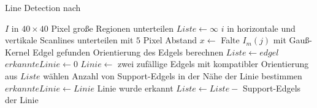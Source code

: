 \begin{algorithm}
	\caption{Line Detection nach \citeauthor{clarke96}}
	\label{src:lineDetection}
	\begin{algorithmic}[1]
		\State $I$ in $40 \times 40$ Pixel große Regionen unterteilen
			\State $Liste \gets \infty$
			\State $i$ in horizontale und vertikale Scanlines unterteilen mit $5$ Pixel Abstand
				\State $x \gets$ Falte $I_m\left(j\right)$ mit Gauß-Kernel
					\Comment Edgel gefunden
					\State Orientierung des Edgels berechnen
					\State $Liste \gets edgel$
				\EndIf
			\EndFor
				\State $erkannteLinie \gets 0$
					\State $Linie \gets$ zwei zufällige Edgels mit kompatibler Orientierung aus $Liste$ wählen
					\State Anzahl von Support-Edgels in der Nähe der Linie bestimmen
						\State $erkannteLinie \gets Linie$
					\EndIf
				\EndFor
					\Comment Linie wurde erkannt
					\State $Liste \gets Liste -$ Support-Edgels der Linie
				\EndIf
			\EndWhile
		\EndFor
	\EndProcedure
	\end{algorithmic}
\end{algorithm}

